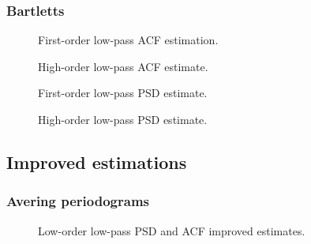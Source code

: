 
\subsubsection{Bartletts}

\begin{figure}[!ht]
\centering

\caption{First-order low-pass ACF estimation.}
\label{fig:Lab1fig3}
\end{figure}

\begin{figure}[!ht]
\centering

\caption{High-order low-pass ACF estimate.}
\label{fig:Lab1fig4}
\end{figure}

\begin{figure}[!ht]
\centering

\caption{First-order low-pass PSD estimate.}
\label{fig:Lab1fig5}
\end{figure}

\begin{figure}[!ht]
\centering

\caption{High-order low-pass PSD estimate.}
\label{fig:Lab1fig6}
\end{figure}


\subsection{Improved estimations}


\subsubsection{Avering periodograms}

\begin{figure}[!ht]
\centering

\caption{Low-order low-pass PSD and ACF improved estimates.}
\label{fig:Lab1fig8}
\end{figure}

